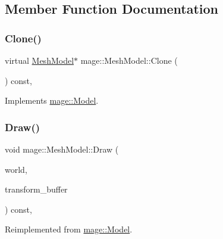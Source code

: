 \subsection{Member Function Documentation}
\hypertarget{classmage_1_1_mesh_model_a7130eca9a1dac038c33b838c15138161}{}\label{classmage_1_1_mesh_model_a7130eca9a1dac038c33b838c15138161} 
\subsubsection{\texorpdfstring{Clone()}{Clone()}}
{\footnotesize\ttfamily virtual \hyperlink{classmage_1_1_mesh_model}{Mesh\+Model}$\ast$ mage\+::\+Mesh\+Model\+::\+Clone (\begin{DoxyParamCaption}{ }\end{DoxyParamCaption}) const\hspace{0.3cm}{\ttfamily [override]}, {\ttfamily [virtual]}}



Implements \hyperlink{classmage_1_1_model_ae5e9bee52da0db8c7a29920c13ed40ea}{mage\+::\+Model}.

\hypertarget{classmage_1_1_mesh_model_a80ef930e0ce901293106ce4ea1336e26}{}\label{classmage_1_1_mesh_model_a80ef930e0ce901293106ce4ea1336e26} 
\subsubsection{\texorpdfstring{Draw()}{Draw()}}
{\footnotesize\ttfamily void mage\+::\+Mesh\+Model\+::\+Draw (\begin{DoxyParamCaption}\item[{const \hyperlink{classmage_1_1_world}{World} \&}]{world,  }\item[{const \hyperlink{structmage_1_1_transform_buffer}{Transform\+Buffer} \&}]{transform\+\_\+buffer }\end{DoxyParamCaption}) const\hspace{0.3cm}{\ttfamily [override]}, {\ttfamily [virtual]}}



Reimplemented from \hyperlink{classmage_1_1_model_a2af6c0c8c05a675315ec5ad4b3763245}{mage\+::\+Model}.

\hypertarget{classmage_1_1_mesh_model_a16adbbbab2041bfe0b15d3fb108d57cf}{}\label{classmage_1_1_mesh_model_a16adbbbab2041bfe0b15d3fb108d57cf} 
